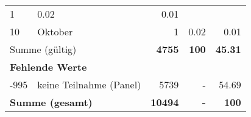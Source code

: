 \begin{longtable}{lXrrr}
       \num{1} &
       \num[round-mode=places,round-precision=2]{0.02} &
         \num[round-mode=places,round-precision=2]{0.01} \\

     10 &
     \multicolumn{1}{X}{ Oktober   } &


       \num{1} &
       \num[round-mode=places,round-precision=2]{0.02} &
         \num[round-mode=places,round-precision=2]{0.01} \\
     \midrule
     \multicolumn{2}{l}{Summe (gültig)} &
       \textbf{\num{4755}} &
     \textbf{\num{100}} &
       \textbf{\num[round-mode=places,round-precision=2]{45.31}} \\
     \multicolumn{5}{l}{\textbf{Fehlende Werte}}\\
       -995 &
       keine Teilnahme (Panel) &
         \num{5739} &
        - &
         \num[round-mode=places,round-precision=2]{54.69} \\
     \midrule
     \multicolumn{2}{l}{\textbf{Summe (gesamt)}} &
          \textbf{\num{10494}} &
        \textbf{-} &
        \textbf{\num{100}} \\
     \bottomrule
     \end{longtable}
     
